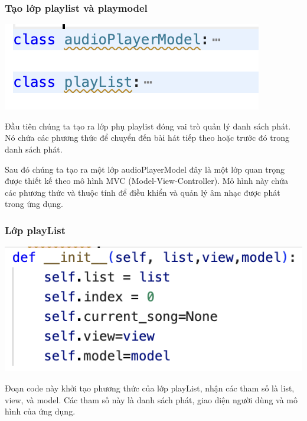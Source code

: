 \documentclass[a4paper]{article}
\begin{document}
\subsubsection{Tạo lớp playlist và playmodel}
\begin{center}
\includegraphics[width=1\linewidth]{template_SGU 2/class_playlist_playmodel.png}
\end{center}
\hspace*{0.5cm} Đầu tiên chúng ta tạo ra lớp phụ playlist đóng vai trò quản lý danh sách phát. Nó chứa các phương thức để chuyển đến bài hát tiếp theo hoặc trước đó trong danh sách phát.

\hspace*{0.5cm} Sau đó chúng ta tạo ra một lớp audioPlayerModel đây là một lớp quan trọng được thiết kế theo mô hình MVC (Model-View-Controller). Mô hình này chứa các phương thức và thuộc tính để điều khiển và quản lý âm nhạc được phát trong ứng dụng.
\subsubsection{Lớp playList}

\begin{center}
\includegraphics[width=1\linewidth]{template_SGU 2/khoitao_playlist.png}
\end{center}

\hspace*{0.5cm} Đoạn code này khởi tạo phương thức của lớp playList, nhận các tham số là list, view, và model. Các tham số này là danh sách phát, giao diện người dùng và mô hình của ứng dụng.
\end{document}

